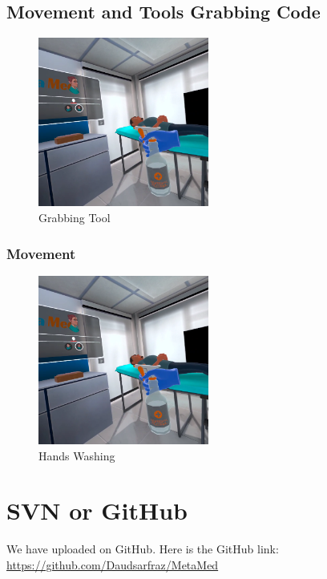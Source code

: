 \subsection{Movement and Tools Grabbing Code}
\begin{figure}[h]
	\centering
	\includegraphics[width=0.5\textwidth, height=0.3\textheight]{Images/Grabbing Tool.png}
	\caption{Grabbing Tool}
	\label{fig:Grabbing-Tool}
\end{figure}

\subsubsection{Movement}
\begin{figure}[h] 
	\centering
	\includegraphics[width=0.5\textwidth, height=0.3\textheight]{Images/Washing hands.png}
	\caption{Hands Washing}
	\label{fig:Hands Washing}
\end{figure}

\section{SVN or GitHub}
We have uploaded on GitHub. Here is the GitHub link: \\
\href{https://github.com/Daudsarfraz/MetaMed}{https://github.com/Daudsarfraz/MetaMed}